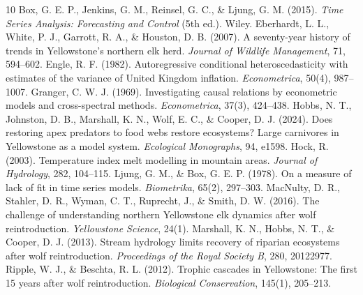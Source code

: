 \documentclass[11pt,a4paper]{article}
\begin{document}
\newpage
\begin{thebibliography}{10}\small
{} Box, G. E. P., Jenkins, G. M., Reinsel, G. C., \& Ljung, G. M. (2015). \emph{Time Series Analysis: Forecasting and Control} (5th ed.). Wiley.
 Eberhardt, L. L., White, P. J., Garrott, R. A., \& Houston, D. B. (2007). A seventy-year history of trends in Yellowstone's northern elk herd. \emph{Journal of Wildlife Management}, 71, 594--602.
 Engle, R. F. (1982). Autoregressive conditional heteroscedasticity with estimates of the variance of United Kingdom inflation. \emph{Econometrica}, 50(4), 987--1007.
 Granger, C. W. J. (1969). Investigating causal relations by econometric models and cross-spectral methods. \emph{Econometrica}, 37(3), 424--438.
 Hobbs, N. T., Johnston, D. B., Marshall, K. N., Wolf, E. C., \& Cooper, D. J. (2024). Does restoring apex predators to food webs restore ecosystems? Large carnivores in Yellowstone as a model system. \emph{Ecological Monographs}, 94, e1598.
 Hock, R. (2003). Temperature index melt modelling in mountain areas. \emph{Journal of Hydrology}, 282, 104--115.
 Ljung, G. M., \& Box, G. E. P. (1978). On a measure of lack of fit in time series models. \emph{Biometrika}, 65(2), 297--303.
 MacNulty, D. R., Stahler, D. R., Wyman, C. T., Ruprecht, J., \& Smith, D. W. (2016). The challenge of understanding northern Yellowstone elk dynamics after wolf reintroduction. \emph{Yellowstone Science}, 24(1).
 Marshall, K. N., Hobbs, N. T., \& Cooper, D. J. (2013). Stream hydrology limits recovery of riparian ecosystems after wolf reintroduction. \emph{Proceedings of the Royal Society B}, 280, 20122977.
 Ripple, W. J., \& Beschta, R. L. (2012). Trophic cascades in Yellowstone: The first 15 years after wolf reintroduction. \emph{Biological Conservation}, 145(1), 205--213.
\end{thebibliography}

\appendix
\end{document}

